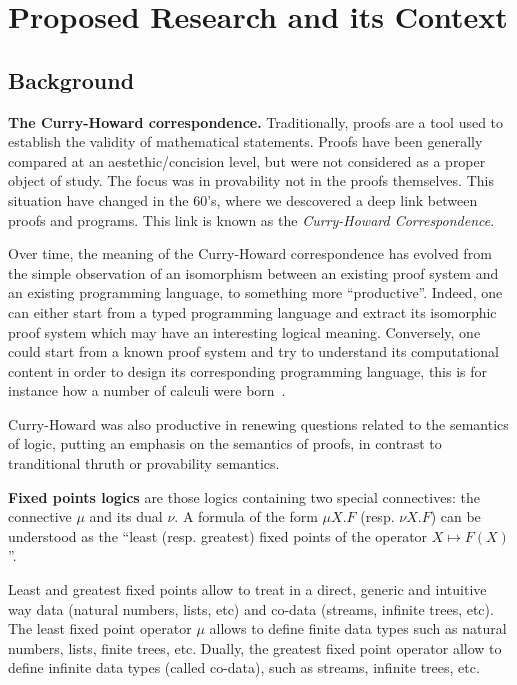 \section{Proposed Research and its Context}

\subsection{Background}

\textbf{The Curry-Howard correspondence.}
Traditionally, proofs are a tool used to establish the validity
of mathematical statements.
%
Proofs  have been generally  compared at an aestethic/concision level, but
were not considered as a proper object of study. The focus was in provability
 not in the proofs themselves.
%
This situation have changed in the 60's, where we descovered a deep link between proofs and programs. This link is known as the \textit{Curry-Howard Correspondence}.
%


  Over time, the meaning of the Curry-Howard correspondence has evolved from
  the simple observation of an isomorphism between an existing
  proof system and an existing programming language, to something more “productive”.
Indeed, one can either start from a typed programming language and extract its isomorphic proof system which may have an interesting logical meaning.
Conversely, one could start from a known proof system and try to understand its computational content
in order to design its
  corresponding programming language,
  this is for instance how a number of calculi were  born~.

  Curry-Howard was also productive in renewing questions related to the
  semantics of logic, putting an emphasis on the semantics of proofs, in contrast to tranditional thruth or provability semantics.

\bigskip
  \textbf{Fixed points logics} are those logics containing two special connectives: the connective $\mu$ and its dual $\nu$. A formula of the form $\mu X. F$ (resp. $\nu X. F$) can be understood as the “least (resp. greatest) fixed points of the operator  $X\mapsto F(X)$”.

Least and greatest fixed points allow to treat in a direct, generic and intuitive way data (natural numbers, lists, etc) and co-data (streams, infinite trees, etc). The least fixed point operator $\mu$ allows to define
finite data types such as natural numbers,  lists, finite trees, etc.
Dually, the greatest fixed point operator allow to
define infinite data types (called co-data), such as streams, infinite trees, etc.


